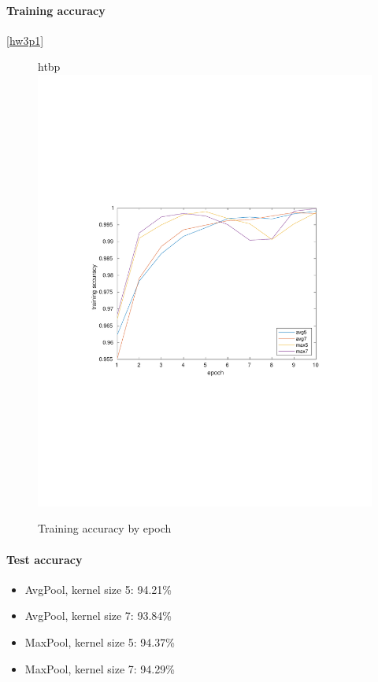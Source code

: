 \documentclass[12pt]{article}
\begin{document}
\paragraph{Training accuracy}
\autoref{hw3p1}
\begin{figure}{htbp}
    \centering
    \includegraphics[trim={3in 3.5in 3in 3.5in},scale=0.7]{./Homework3/output/cnn/accuracy.pdf}
    \caption{Training accuracy by epoch}
    \label{hw3p1}
\end{figure}
\paragraph{Test accuracy}
\begin{itemize}
    \item AvgPool, kernel size 5: 94.21\%
    \item AvgPool, kernel size 7: 93.84\%
    \item MaxPool, kernel size 5: 94.37\%
    \item MaxPool, kernel size 7: 94.29\%
\end{itemize}
\end{document}
